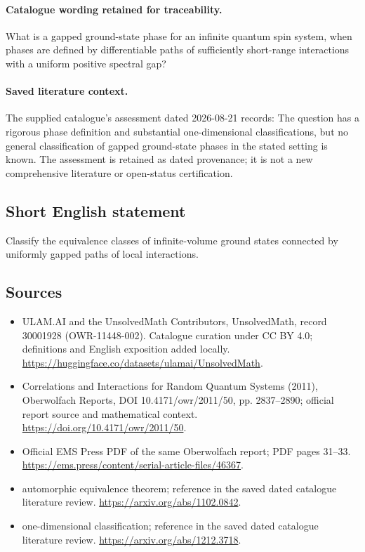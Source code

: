 \documentclass[11pt]{article}
\begin{document}
\paragraph{Catalogue wording retained for traceability.}
What is a gapped ground-state phase for an infinite quantum spin system, when phases are defined by differentiable paths of sufficiently short-range interactions with a uniform positive spectral gap?

\paragraph{Saved literature context.} The supplied catalogue's assessment dated 2026-08-21 records: The question has a rigorous phase definition and substantial one-dimensional classifications, but no general classification of gapped ground-state phases in the stated setting is known. The assessment is retained as dated provenance; it is not a new comprehensive literature or open-status certification.
\subsection{Short English statement}
Classify the equivalence classes of infinite-volume ground states connected by uniformly gapped paths of local interactions.
\subsection{Sources}
\begin{itemize}
\item[\hypertarget{source:30001928:1}{S1}] ULAM.AI and the UnsolvedMath Contributors, UnsolvedMath, record 30001928 (OWR-11448-002). Catalogue curation under CC BY 4.0; definitions and English exposition added locally.
\url{https://huggingface.co/datasets/ulamai/UnsolvedMath}.
\item[\hypertarget{source:30001928:2}{S2}] Correlations and Interactions for Random Quantum Systems (2011), Oberwolfach Reports, DOI 10.4171/owr/2011/50, pp. 2837--2890; official report source and mathematical context.
\url{https://doi.org/10.4171/owr/2011/50}.
\item[\hypertarget{source:30001928:3}{S3}] Official EMS Press PDF of the same Oberwolfach report; PDF pages 31--33.
\url{https://ems.press/content/serial-article-files/46367}.
\item[\hypertarget{source:30001928:4}{S4}] automorphic equivalence theorem; reference in the saved dated catalogue literature review.
\url{https://arxiv.org/abs/1102.0842}.
\item[\hypertarget{source:30001928:5}{S5}] one-dimensional classification; reference in the saved dated catalogue literature review.
\url{https://arxiv.org/abs/1212.3718}.
\end{itemize}
\label{end:30001928}
\end{document}
